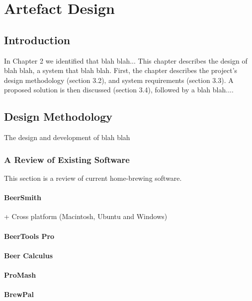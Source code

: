 \chapter{Artefact Design} \label{a-d}

\section{Introduction} \label{a-d--introduction}

In Chapter 2 we identified that blah blah...
This chapter describes the design of blah blah, a system that blah blah.  First, the chapter describes the project’s design methodology (section 3.2), and system requirements (section 3.3).  A proposed solution is then discussed (section 3.4), followed by a blah blah....


\section{Design Methodology} \label{a-d--methodology}

The design and development of blah blah

\subsection{A Review of Existing Software} \label{a--d--review-of-existing-software}

This section is a review of current home-brewing software.

\subsubsection{BeerSmith}

+ Cross platform (Macintosh, Ubuntu and Windows)

\subsubsection{BeerTools Pro}
\subsubsection{Beer Calculus}
\subsubsection{ProMash}
\subsubsection{BrewPal}
